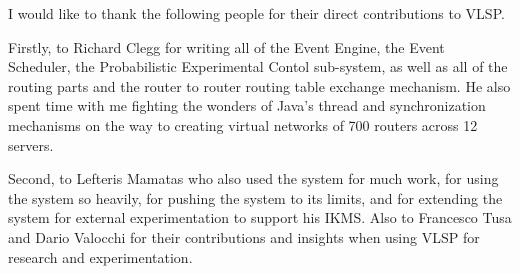 I would like to thank the following people for their direct
contributions to VLSP.

Firstly, to Richard Clegg for writing all of the Event Engine, the
Event Scheduler, the Probabilistic Experimental Contol sub-system, as
well as all of the routing parts and the router to router routing
table exchange mechanism. He also spent time with me fighting the
wonders of Java's thread and synchronization mechanisms on the way to
creating virtual networks of 700 routers across 12 servers.

Second, to Lefteris Mamatas who also used the system for much work,
for using the system so heavily, for pushing the system to its limits, and for
extending the system for external experimentation to support his IKMS.
Also to Francesco Tusa and Dario Valocchi for their contributions and
insights when using VLSP for research and experimentation.
